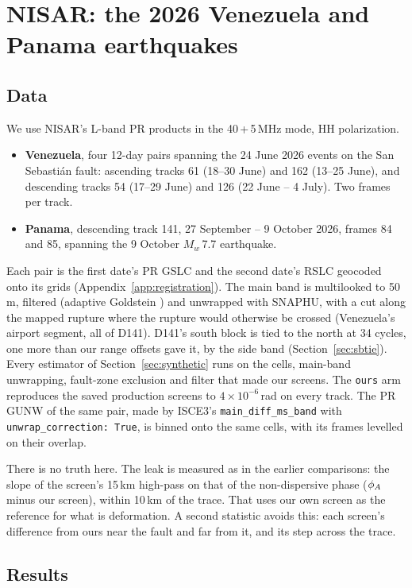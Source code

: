 \section{NISAR: the 2026 Venezuela and Panama earthquakes}
\label{sec:nisar}

\subsection{Data}
We use NISAR's L-band PR products in the 40\,+\,5\,MHz mode, HH polarization.
\begin{itemize}
  \item \textbf{Venezuela}, four 12-day pairs spanning the 24 June 2026 events on the San Sebasti\'an fault:
        ascending tracks 61 (18--30 June) and 162 (13--25 June), and descending tracks 54 (17--29 June) and 126
        (22 June -- 4 July). Two frames per track.
  \item \textbf{Panama}, descending track 141, 27 September -- 9 October 2026, frames 84 and 85, spanning the
        9 October $M_w$\,7.7 earthquake.
\end{itemize}
Each pair is the first date's PR GSLC and the second date's RSLC geocoded onto its grids
(Appendix~\ref{app:registration}). The main band is multilooked to 50\,m, filtered (adaptive Goldstein
\citep{goldstein1998radar}) and unwrapped with SNAPHU, with a cut along the mapped rupture where the rupture would
otherwise be crossed (Venezuela's airport segment, all of D141). D141's south block is tied to the north at 34
cycles, one more than our range offsets gave it, by the side band (Section~\ref{sec:sbtie}). Every estimator of Section~\ref{sec:synthetic} runs on the cells, main-band unwrapping, fault-zone exclusion
and filter that made our screens. The \texttt{ours} arm reproduces the saved production screens to $4\times10^{-6}$\,rad on every track. The PR GUNW
of the same pair, made by ISCE3's \texttt{main\_diff\_ms\_band} with \texttt{unwrap\_correction: True}, is binned onto
the same cells, with its frames levelled on their overlap.

There is no truth here. The leak is measured as in the earlier comparisons: the slope of the screen's 15\,km
high-pass on that of the non-dispersive phase ($\phi_A$ minus our screen), within 10\,km of the trace. That uses our
own screen as the reference for what is deformation. A second statistic avoids this: each screen's difference from
ours near the fault and far from it, and its step across the trace.

\subsection{Results}
